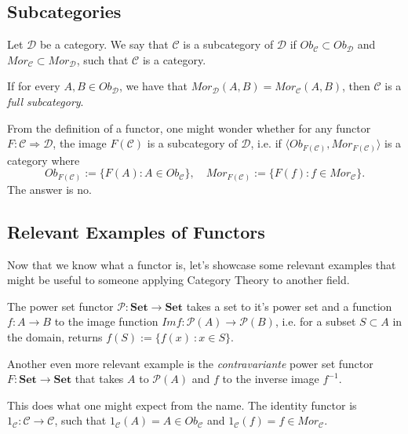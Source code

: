 \subsection{Subcategories}

\begin{definition}[Subcategory]
	Let $\mathcal D$ be a category. We say that $\mathcal C$
	is a subcategory of $\mathcal D$ if $Ob_\mathcal C \subset Ob_\mathcal D$ and
	$Mor_\mathcal C \subset Mor_\mathcal D$, such that $\mathcal C$ is a category.

	If for every $A, B \in Ob_\mathcal D$, we have that $Mor_\mathcal D (A,B) = Mor_\mathcal C(A,B)$,
	then $\mathcal C$ is a \textit{full subcategory}.
\end{definition}

From the definition of a functor, one might wonder whether for any
functor $F:\mathcal C \Rightarrow \mathcal D$,
the image $F(\mathcal C)$ is a subcategory of $\mathcal D$, i.e.
if $\langle Ob_{F(\mathcal C)}, Mor_{F(\mathcal C)} \rangle$ is a category where
\begin{displaymath}
	Ob_{F(\mathcal C)}:= \{F(A) : A \in Ob_\mathcal C\}, \quad
	Mor_{F(\mathcal C)}:= \{F(f) : f \in Mor_\mathcal C\}.
\end{displaymath}
The answer is no.

\subsection{Relevant Examples of Functors}

Now that we know what a functor is, let's showcase some relevant examples
that might be useful to someone applying Category Theory to another field.

\begin{example}
	The power set functor $\mathcal P : \mathbf{Set} \to \mathbf{Set}$ takes a
	set to it's power set and a function $f:A\to B$ to the image function
	$Im f : \mathcal P(A) \to \mathcal P(B)$, i.e. for a subset $S \subset A$
	in the domain, returns $f(S) := \{ f(x) \ : x \in S\}$.

	Another even more relevant example is the \textit{contravariante} power set
	functor $F : \mathbf{Set} \to \mathbf{Set}$ that takes $A$ to $\mathcal P(A)$
	and $f$ to the inverse image $f^{-1}$.
\end{example}

\begin{example}
	This does what one might expect from the name. The identity
	functor is $1_\mathcal C : \mathcal C \to \mathcal C$, such that
	$1_\mathcal C (A) = A \in Ob_\mathcal C$ and
	$1_\mathcal C (f) = f \in Mor_\mathcal C$.
\end{example}

